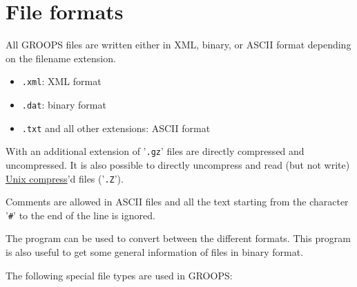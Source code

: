 \section{File formats}\label{general.fileFormat}
All GROOPS files are written either in XML, binary, or ASCII format depending on the filename extension.
\begin{itemize}
\item \verb|.xml|: XML format
\item \verb|.dat|: binary format
\item \verb|.txt| and all other extensions: ASCII format
\end{itemize}

With an additional extension of '\verb|.gz|' files are directly compressed and uncompressed. It is also possible to directly uncompress and read (but not write) \href{https://en.wikipedia.org/wiki/Compress}{Unix compress}'d files ('\verb|.Z|').

Comments are allowed in ASCII files and all the text starting from the character '\verb|#|' to the end of the line is ignored.

The program  can be used to convert between the different formats. This program is also useful to get
some general information of files in binary format.

The following special file types are used in GROOPS:
